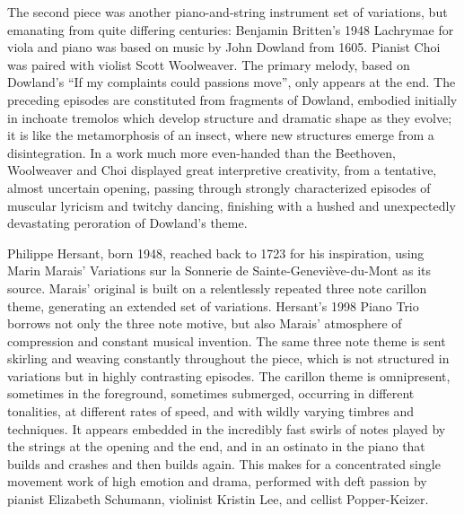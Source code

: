 The second piece was another piano-and-string instrument set of variations, but emanating from quite differing centuries: Benjamin Britten’s 1948 Lachrymae for viola and piano was based on music by John Dowland from 1605. Pianist Choi was paired with violist Scott Woolweaver. The primary melody, based on Dowland’s “If my complaints could passions move”, only appears at the end. The preceding episodes are constituted from fragments of Dowland, embodied initially in inchoate tremolos which develop structure and dramatic shape as they evolve; it is like the metamorphosis of an insect, where new structures emerge from a disintegration. In a work much more even-handed than the Beethoven, Woolweaver and Choi displayed great interpretive creativity, from a tentative, almost uncertain opening, passing through strongly characterized episodes of muscular lyricism and twitchy dancing, finishing with a hushed and unexpectedly devastating peroration of Dowland’s theme.

Philippe Hersant, born 1948, reached back to 1723 for his inspiration, using Marin Marais’ Variations sur la Sonnerie de Sainte-Geneviève-du-Mont as its source. Marais’ original is built on a relentlessly repeated three note carillon theme, generating an extended set of variations. Hersant’s 1998 Piano Trio borrows not only the three note motive, but also Marais’ atmosphere of compression and constant musical invention. The same three note theme is sent skirling and weaving constantly throughout the piece, which is not structured in variations but in highly contrasting episodes. The carillon theme is omnipresent, sometimes in the foreground, sometimes submerged, occurring in different tonalities, at different rates of speed, and with wildly varying timbres and techniques. It appears embedded in the incredibly fast swirls of notes played by the strings at the opening and the end, and in an ostinato in the piano that builds and crashes and then builds again. This makes for a concentrated single movement work of high emotion and drama, performed with deft passion by pianist Elizabeth Schumann, violinist Kristin Lee, and cellist Popper-Keizer.

